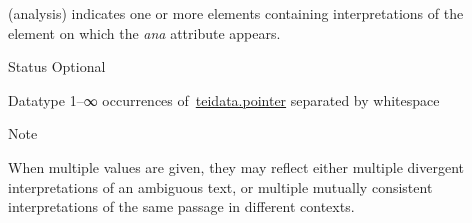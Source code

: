 \begin{reflist}
\begin{sansreflist}
  (analysis) indicates one or more elements containing interpretations of the element on which the {\itshape ana} attribute appears.
\begin{reflist}
    \item[{Status}]
  Optional
    \item[{Datatype}]
  1–∞ occurrences of \hyperref[TEI.teidata.pointer]{teidata.pointer} separated by whitespace
    \item[{Note}]
  \par
When multiple values are given, they may reflect either multiple divergent interpretations of an ambiguous text, or multiple mutually consistent interpretations of the same passage in different contexts.
\end{reflist}  
\end{sansreflist}  
\end{reflist}  
